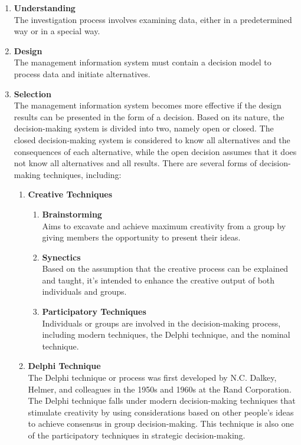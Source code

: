 \documentclass[12pt,titlepage]{article}
\begin{document}
\begin{enumerate}
    \item \textbf{Understanding}\\
    The investigation process involves examining data, either in a predetermined way or in a special way.
    \item \textbf{Design}\\
    The management information system must contain a decision model to process data and initiate alternatives.
    \item \textbf{Selection}\\
    The management information system becomes more effective if the design results can be presented in the form of a decision. Based on its nature, the decision-making system is divided into two, namely open or closed. The closed decision-making system is considered to know all alternatives and the consequences of each alternative, while the open decision assumes that it does not know all alternatives and all results.
    There are several forms of decision-making techniques, including:
    \begin{enumerate}[label=\arabic*.]
        \item \textbf{Creative Techniques}
        \begin{enumerate}[label=\alph*.]
            \item \textbf{Brainstorming}\\
            Aims to excavate and achieve maximum creativity from a group by giving members the opportunity to present their ideas.
            \item \textbf{Synectics}\\
            Based on the assumption that the creative process can be explained and taught, it's intended to enhance the creative output of both individuals and groups.
            \item \textbf{Participatory Techniques}\\
            Individuals or groups are involved in the decision-making process, including modern techniques, the Delphi technique, and the nominal technique.
        \end{enumerate}
        \item \textbf{Delphi Technique}\\
        The Delphi technique or process was first developed by N.C. Dalkey, Helmer, and colleagues in the 1950s and 1960s at the Rand Corporation. The Delphi technique falls under modern decision-making techniques that stimulate creativity by using considerations based on other people's ideas to achieve consensus in group decision-making. This technique is also one of the participatory techniques in strategic decision-making.        

\end{enumerate}
\end{enumerate}
\end{document}
